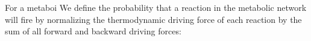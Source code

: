 For a metaboi
We define the probability that a reaction in the metabolic network will fire by normalizing the thermodynamic driving force of each reaction by the sum of all forward and backward driving forces: